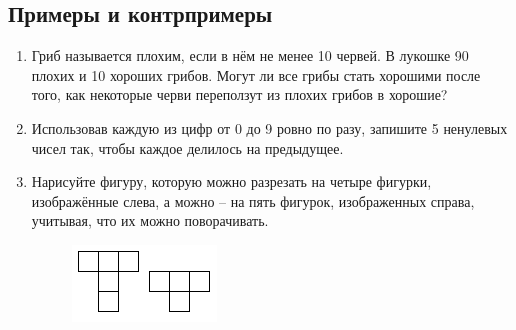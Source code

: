 \documentclass[a4paper,12pt]{article}
\begin{document}
    \subsection*{Примеры и контрпримеры}
    \begin{enumerate}
        \item Гриб называется плохим, если в нём не менее 10 червей. В лукошке 90 плохих и 10 хороших грибов. Могут ли все грибы стать хорошими после того, как некоторые черви переползут из плохих грибов в хорошие?
        \item Использовав каждую из цифр от 0 до 9 ровно по разу, запишите 5 ненулевых чисел так, чтобы каждое делилось на предыдущее.
        \item Нарисуйте фигуру, которую можно разрезать на четыре фигурки, изображённые слева, а можно – на пять фигурок, изображенных справа, учитывая, что их можно поворачивать.
        \begin{figure}[h]
            \centering
            \includegraphics[width=0.15\linewidth]{image.png}
        \end{figure}
    \end{enumerate}
\end{document}
